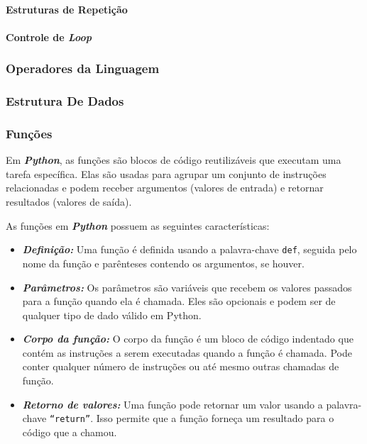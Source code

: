 \documentclass[a4paper, 12pt, onecolumn,singlespacing]{article}
\begin{document}
	\paragraph{Estruturas de Repetição}
	
	\paragraph{Controle de \textit{Loop}}
	
	\subsubsection{Operadores da Linguagem}
	
	\subsubsection{Estrutura De Dados}
	
	\subsubsection{Funções}
	
	Em \textbf{\textit{Python}}, as funções são blocos de código reutilizáveis que executam uma tarefa específica. Elas são usadas para agrupar um conjunto de instruções relacionadas e podem receber argumentos (valores de entrada) e retornar resultados (valores de saída).
	
	As funções em \textbf{\textit{Python}} possuem as seguintes características:
	
	\begin{itemize}
	
	\item \textbf{\textit{Definição:}} Uma função é definida usando a palavra-chave \texttt{def}, seguida pelo nome da função e parênteses contendo os argumentos, se houver.
	
	\item \textbf{\textit{Parâmetros:}} Os parâmetros são variáveis que recebem os valores passados para a função quando ela é chamada. Eles são opcionais e podem ser de qualquer tipo de dado válido em Python.
	
	\item \textbf{\textit{Corpo da função:}} O corpo da função é um bloco de código indentado que contém as instruções a serem executadas quando a função é chamada. Pode conter qualquer número de instruções ou até mesmo outras chamadas de função.
	
	\item \textbf{\textit{Retorno de valores:}} Uma função pode retornar um valor usando a palavra-chave \texttt{``return''}. Isso permite que a função forneça um resultado para o código que a chamou.
	
	\end{itemize}
	
\end{document}
